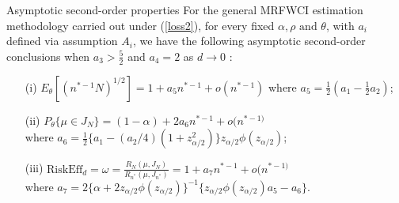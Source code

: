 \documentclass [xcolor=svgnames, t] {beamer}
\begin{document}
\begin{frame}{Asymptotic second-order properties}
\vspace{5mm}
For the general MRFWCI estimation methodology carried out under (\ref{loss2}), for every 
fixed $\alpha, \rho \text{ and } \theta$, with $a_i$ defined 
via assumption $A_i$, we have the following asymptotic second-order conclusions 
when $a_3>\frac{5}{2}$ and $a_4=2$ as $d \xrightarrow{} 0$ :
\begin{enumerate}
\item[(i)] $E_{\theta}[(n^{*-1}N)^{1/2}]=1+a_5n^{*-1}+o(n^{*-1})$ where $a_5=\frac{1}{2}(a_1-\frac{1}{2}a_2)$;
\item[(ii)] $P_{\theta} \{ \mu \in J_N\} = (1-\alpha)+2a_6n^{*-1}+o(n^{*-1)}$\\
where $a_6=\frac{1}{2}\{ a_1-(a_2/4)(1+z^2_{\alpha/2}) \}z_{\alpha/2}\phi(z_{\alpha/2})$;
\item[(iii)] $\text{RiskEff}_d =\omega=\frac{R_N(\mu,J_N)}{R_{n^*}(\mu,J_{n^*})}= 1+ a_7 n^{*-1}+o(n^{*-1)}$ \\ 
where $a_7 = 2\{\alpha + 2z_{\alpha/2}\phi(z_{\alpha/2})\}^{-1} \{z_{\alpha/2}\phi(z_{\alpha/2})a_5-a_6\}$.
\end{enumerate}
 
\end{frame}

\end{document}
